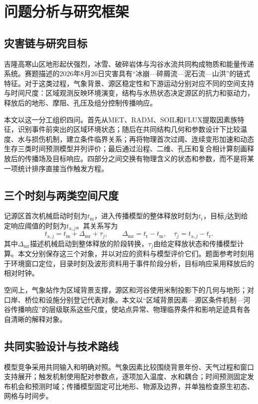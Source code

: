 \section{问题分析与研究框架}\label{sec:intro}
\subsection{灾害链与研究目标}
吉隆高寒山区地形起伏强烈，冰雪、破碎岩体与沟谷水流共同构成物质和能量传递系统。赛题描述的2026年8月26日灾害具有“冰崩—碎屑流—泥石流—山洪”的链式特征。对于这类过程，气象背景、源区稳定性和下游运动分别对应不同的空间支持与时间尺度：区域观测反映环境演变，结构与水热状态决定源区的抗力和驱动力，释放后的地形、摩阻、孔压及组分控制传播响应。

本文以这一分工组织四问。首先从MET、RADM、SOIL和FLUX提取因素族特征，识别事件前突出的区域环境状态；随后在共同结构几何和参数设计下比较温度、水与损伤机制，建立条件临界关系；再将物理首次过阈、连续变形加速和动态生存三类时间预测模型并列评价；最后通过沿程、二维、孔压和复合相计算刻画释放后的传播场及目标响应。四部分之间交换有物理含义的状态和参数，而不是将某一项统计排序直接当作触发方程。

\subsection{三个时刻与两类空间尺度}
记源区首次机械启动时刻为$t_{\mathrm m}$，进入传播模型的整体释放时刻为$t_{\mathrm r}$，目标$j$达到给定响应阈值的时刻为$t_{\mathrm a,j}$。其关系写为
\begin{equation}
 t_{\mathrm a,j}=t_{\mathrm m}+\Delta_{\mathrm{mr}}+\tau_j,\qquad
 \Delta_{\mathrm{mr}}=t_{\mathrm r}-t_{\mathrm m},\quad
 \tau_j=t_{\mathrm a,j}-t_{\mathrm r}.
 \label{eq:common-clock}
\end{equation}
其中$\Delta_{\mathrm{mr}}$描述机械启动到整体释放的阶段转换，$\tau_j$由给定释放状态和传播模型计算。本文分别保存这三个对象，并以对应的资料与模型评价它们。题面参考时刻用于环境窗口定位，目录时刻及波形资料用于事件阶段分析，目标响应采用释放后的相对时钟。

空间上，气象站作为区域背景支撑，源区和河谷使用米制投影下的几何与地形；对口岸、桥位和设施分别登记代表对象。本文以“区域背景因素—源区条件机制—河谷传播响应”的层级联系这些尺度，使站点异常、物理临界条件和影响足迹具有各自清晰的解释对象。

\subsection{共同实验设计与技术路线}
模型竞争采用共同输入和明确对照。气象因素比较围绕背景年份、天气过程和窗口支持展开；触发机制使用配对参数点，逐项加入温度、水和耦合；时间预测固定发布机会和预测时域；传播模型固定可比地形、物源及边界，并单独检查原生初态、网格与时间步。

